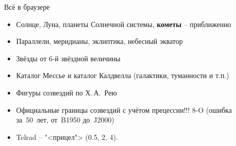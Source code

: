 \begin{frame}{Всё в браузере}
  \begin{itemize}
  \item Солнце, Луна, планеты Солнечной системы, \textbf{кометы} -- приближенно
  \item Параллели, меридианы, эклиптика, небесный экватор
  \item Звёзды от 6-й звёздной величины
  \item Каталог Мессье и каталог Калдвелла (галактики, туманности и т.п.)
  \item Фигуры созвездий по Х.\,{}А.~Рею
  \item Официальные границы созвездий с учётом прецессии!!! 8-O
    (ошибка за~50~лет, от~B1950 до~J2000)
  \item Telrad -- "<прицел"> (0.5\textdegree{}, 2\textdegree{}, 4\textdegree{}).
  \end{itemize}
\end{frame}
